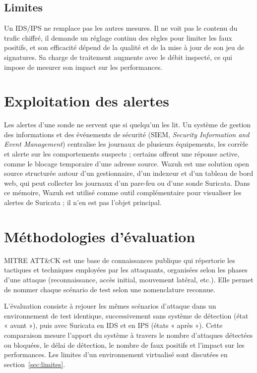 \subsection{Limites}

Un IDS/IPS ne remplace pas les autres mesures. Il ne voit pas le contenu du trafic chiffré, il demande un réglage continu des règles pour limiter les faux positifs, et son efficacité dépend de la qualité et de la mise à jour de son jeu de signatures. Sa charge de traitement augmente avec le débit inspecté, ce qui impose de mesurer son impact sur les performances.

\section{Exploitation des alertes}

Les alertes d'une sonde ne servent que si quelqu'un les lit. Un système de gestion des informations et des événements de sécurité (SIEM, \emph{Security Information and Event Management}) centralise les journaux de plusieurs équipements, les corrèle et alerte sur les comportements suspects ; certains offrent une réponse active, comme le blocage temporaire d'une adresse source. Wazuh est une solution open source structurée autour d'un gestionnaire, d'un indexeur et d'un tableau de bord web, qui peut collecter les journaux d'un pare-feu ou d'une sonde Suricata\cite{wazuhdoc}. Dans ce mémoire, Wazuh est utilisé comme outil complémentaire pour visualiser les alertes de Suricata ; il n'en est pas l'objet principal.

\section{Méthodologies d'évaluation}

MITRE ATT\&CK est une base de connaissances publique qui répertorie les tactiques et techniques employées par les attaquants, organisées selon les phases d'une attaque (reconnaissance, accès initial, mouvement latéral, etc.)\cite{attck}. Elle permet de nommer chaque scénario de test selon une nomenclature reconnue.

L'évaluation consiste à rejouer les mêmes scénarios d'attaque dans un environnement de test identique, successivement sans système de détection (état « avant »), puis avec Suricata en IDS et en IPS (états « après »). Cette comparaison mesure l'apport du système à travers le nombre d'attaques détectées ou bloquées, le délai de détection, le nombre de faux positifs et l'impact sur les performances. Les limites d'un environnement virtualisé sont discutées en section~\ref{sec:limites}.

